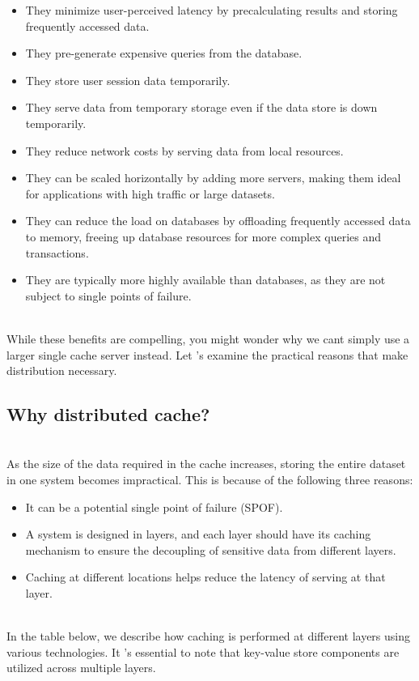 \begin{itemize}
\item
\protect{}\label{bM7VOtKkJH1uJHwJbSB0v}
They minimize user-perceived latency by precalculating results and storing frequently accessed data.
\item
\protect{}\label{YpUl9IIXHgkCYUNJWQWsN}
They pre-generate expensive queries from the database.
\item
\protect{}\label{x9xStcP19USEvoem4szRV}
They store user session data temporarily.
\item
\protect{}\label{d5wKBqd-69rDgnB3U2l0D}
They serve data from temporary storage even if the data store is down temporarily.
\item
\protect{}\label{-V5eR4Dq6jhxbr5r3R89D}
They reduce network costs by serving data from local resources.
\item
\protect{}\label{GNKcM-QOsW-ZslL3-VIkT}
They can be scaled horizontally by adding more servers, making them ideal for applications with high traffic or large datasets.
\item
\protect{}\label{CPMEGehwEQUMGsL5uk3Eu}
They can reduce the load on databases by offloading frequently accessed data to memory, freeing up database resources for more complex queries and transactions.
\item
\protect{}\label{4h9LgxoiiWpwh7iFwK331}
They are typically more highly available than databases, as they are not subject to single points of failure.
\end{itemize}
\\
While these benefits are compelling, you might wonder why we can\textquotesingle t simply use a larger single cache server instead. Let 's examine the practical reasons that make distribution necessary.

\subsection{Why distributed cache?}\label{0yeKZqspmm3iB3L6wEvIe}
\\
As the size of the data required in the cache increases, storing the entire dataset in one system becomes impractical. This is because of the following three reasons:

\begin{itemize}
\item
\protect{}\label{k8wFFkXxaM5hMtZbBj5hk}
It can be a potential single point of failure (SPOF).
\item
\protect{}\label{vNY9BS0rESV2LRVM_2GtC}
A system is designed in layers, and each layer should have its caching mechanism to ensure the decoupling of sensitive data from different layers.
\item
\protect{}\label{lc8FSp4sYC6OzvCDkLxCE}
Caching at different locations helps reduce the latency of serving at that layer.
\end{itemize}
\\
In the table below, we describe how caching is performed at different layers using various technologies. It 's essential to note that key-value store components are utilized across multiple layers.

